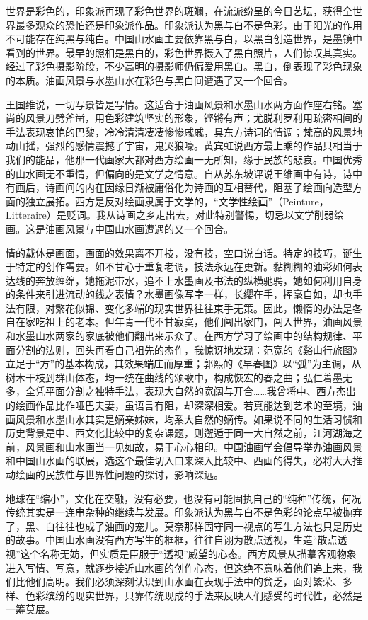\documentclass{article}
\begin{document}
世界是彩色的，印象派再现了彩色世界的斑斓，在流派纷呈的今日艺坛，获得全世界最多观众的恐怕还是印象派作品。印象派认为黑与白不是色彩，由于阳光的作用不可能存在纯黑与纯白。中国山水画主要依靠黑与白，以黑白创造世界，是墨镜中看到的世界。最早的照相是黑白的，彩色世界摄入了黑白照片，人们惊叹其真实。经过了彩色摄影阶段，不少高明的摄影师仍偏爱用黑白。黑白，倒表现了彩色现象的本质。油画风景与水墨山水在彩色与黑白间遭遇了又一个回合。

王国维说，一切写景皆是写情。这适合于油画风景和水墨山水两方面作座右铭。塞尚的风景刀劈斧凿，用色彩建筑坚实的形象，铿锵有声；尤脱利罗利用疏密相间的手法表现哀艳的巴黎，冷冷清清凄凄惨惨戚戚，具东方诗词的情调；梵高的风景地动山摇，强烈的感情震撼了宇宙，鬼哭狼嚎。黄宾虹说西方最上乘的作品只相当于我们的能品，他那一代画家大都对西方绘画一无所知，缘于民族的悲哀。中国优秀的山水画无不重情，但偏向的是文学之情意。自从苏东坡评说王维画中有诗，诗中有画后，诗画间的内在因缘日渐被庸俗化为诗画的互相替代，阻塞了绘画向造型方面的独立展拓。西方是反对绘画隶属于文学的，“文学性绘画”（Peinture，Litteraire）是贬词。我从诗画之乡走出去，对此特别警惕，切忌以文学削弱绘画。这是油画风景与中国山水画遭遇的又一个回合。

情的载体是画面，画面的效果离不开技，没有技，空口说白话。特定的技巧，诞生于特定的创作需要。如不甘心于重复老调，技法永远在更新。黏糊糊的油彩如何表达线的奔放缠绵，她拖泥带水，追不上水墨画及书法的纵横驰骋，她如何利用自身的条件来引进流动的线之表情？水墨画像写字一样，长缨在手，挥毫自如，却也手法有限，对繁花似锦、变化多端的现实世界往往束手无策。因此，懒惰的办法是各自在家吃祖上的老本。但年青一代不甘寂寞，他们闯出家门，闯入世界，油画风景和水墨山水两家的家底被他们翻出来示众了。在西方学习了绘画中的结构规律、平面分割的法则，回头再看自己祖先的杰作，我惊讶地发现：范宽的《谿山行旅图》立足于“方”的基本构成，其效果端庄而厚重；郭熙的《早春图》以“弧”为主调，从树木干枝到群山体态，均一统在曲线的颂歌中，构成恢宏的春之曲；弘仁着墨无多，全凭平面分割之独特手法，表现大自然的宽阔与开合……我曾将中、西方杰出的绘画作品比作哑巴夫妻，虽语言有阻，却深深相爱。若真能达到艺术的至境，油画风景和水墨山水其实是嫡亲姊妹，均系大自然的嫡传。如果说不同的生活习惯和历史背景是中、西文化比较中的复杂课题，则邂逅于同一大自然之前，江河湖海之前，风景画和山水画当一见如故，易于心心相印。中国油画学会倡导举办油画风景和中国山水画的联展，选这个最佳切入口来深入比较中、西画的得失，必将大大推动绘画的民族性与世界性问题的探讨，影响深远。

地球在“缩小”，文化在交融，没有必要，也没有可能固执自己的“纯种”传统，何况传统其实是一连串杂种的继续与发展。印象派认为黑与白不是色彩的论点早被抛弃了，黑、白往往也成了油画的宠儿。莫奈那样固守同一视点的写生方法也只是历史的故事。中国山水画没有西方写生的框框，往往自诩为散点透视，生造“散点透视”这个名称无妨，但实质是臣服于“透视”威望的心态。西方风景从描摹客观物象进入写情、写意，就逐步接近山水画的创作心态，但这绝不意味着他们追上来，我们比他们高明。我们必须深刻认识到山水画在表现手法中的贫乏，面对繁荣、多样、色彩缤纷的现实世界，只靠传统现成的手法来反映人们感受的时代性，必然是一筹莫展。
\end{document}
